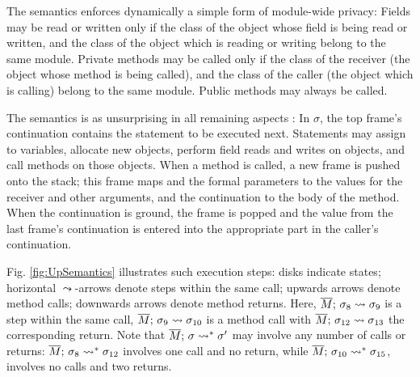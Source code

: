 {The semantics enforces dynamically a simple form of module-wide privacy: 
Fields may be read or written only if the class of the object whose field is being read or written, and the class of the object which is reading or writing belong to the same module.}
Private methods may be called only if the class of the receiver (the object whose method is being called), and the class of the caller (the object which is calling) belong to the same module.
Public methods may always be called.

The semantics is as unsurprising in all remaining aspects  :  
In $\sigma$, the  top frame's continuation contains the statement to be  executed next.  
 Statements may assign to variables, allocate new objects, 
perform field reads and writes on objects, and
 call methods on those objects. 
When a method is called, a new frame is pushed onto the stack; this frame  maps  and the formal parameters to  the values for the receiver and other arguments, and the continuation to the body of the method.  When the continuation is ground, the frame is popped and the value from the last frame's continuation is entered into the appropriate part in the caller's continuation. 


{Fig. \ref{fig:UpSemantics} illustrates  such  execution steps:  disks indicate states;
 horizontal $\leadsto$-arrows denote   steps  within the same  call; upwards arrows denote  method calls;
 downwards arrows denote method returns. %
 Here,   $\overline{M};\, \sigma_8 \leadsto {\sigma_9} $ is a step within the same call, $\overline{M};\, \sigma_9 \leadsto {\sigma_{10}} $ is a method call   
with $\overline{M};\, \sigma_{12} \leadsto {\sigma_{13}} $ %
the corresponding return. 
 {Note that  $\overline{M};\, \sigma \leadsto^* {\sigma'}$ may involve  any number of  calls or returns: 
 $\overline{M};\, \sigma_8 \leadsto^* {\sigma_{12}}$ involves one call and no return,
while $\overline{M};\, \sigma_{10} \leadsto^* {\sigma_{15}}$,   involves no calls and two returns.
}
} 

